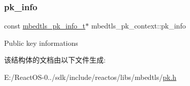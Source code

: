 \subsubsection{\texorpdfstring{pk\+\_\+info}{pk\_info}}
{\footnotesize\ttfamily const \hyperlink{structmbedtls__pk__info__t}{mbedtls\+\_\+pk\+\_\+info\+\_\+t}$\ast$ mbedtls\+\_\+pk\+\_\+context\+::pk\+\_\+info}

Public key informations 

该结构体的文档由以下文件生成\+:\begin{DoxyCompactItemize}
\item 
E\+:/\+React\+O\+S-\/0../sdk/include/reactos/libs/mbedtls/\hyperlink{pk_8h}{pk.\+h}\end{DoxyCompactItemize}

